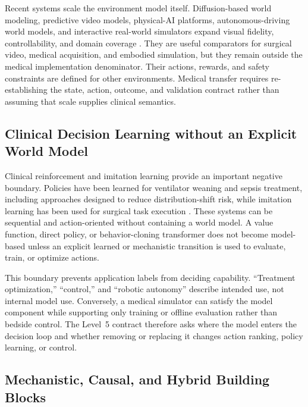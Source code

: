 Recent systems scale the environment model itself. Diffusion-based world modeling, predictive video models, physical-AI platforms, autonomous-driving world models, and interactive real-world simulators expand visual fidelity, controllability, and domain coverage \citep{Alonso2024DiffusionWorldModeling,Assran2025VJepa2,NVIDIA2025Cosmos,Hu2023Gaia1Generative,Russell2025Gaia2Controllable,Yang2024LearningInteractiveReal}. They are useful comparators for surgical video, medical acquisition, and embodied simulation, but they remain outside the medical implementation denominator. Their actions, rewards, and safety constraints are defined for other environments. Medical transfer requires re-establishing the state, action, outcome, and validation contract rather than assuming that scale supplies clinical semantics.

\subsection{Clinical Decision Learning without an Explicit World Model}

Clinical reinforcement and imitation learning provide an important negative boundary. Policies have been learned for ventilator weaning and sepsis treatment, including approaches designed to reduce distribution-shift risk, while imitation learning has been used for surgical task execution \citep{Prasad2017ReinforcementLearningApproach,Raghu2017ContinuousStateSpace,Kaushik2022ConservativeQLearning,Kim2024SurgicalRobotTransformer}. These systems can be sequential and action-oriented without containing a world model. A value function, direct policy, or behavior-cloning transformer does not become model-based unless an explicit learned or mechanistic transition is used to evaluate, train, or optimize actions.

This boundary prevents application labels from deciding capability. ``Treatment optimization,'' ``control,'' and ``robotic autonomy'' describe intended use, not internal model use. Conversely, a medical simulator can satisfy the model component while supporting only training or offline evaluation rather than bedside control. The Level~5 contract therefore asks where the model enters the decision loop and whether removing or replacing it changes action ranking, policy learning, or control.

\subsection{Mechanistic, Causal, and Hybrid Building Blocks}

